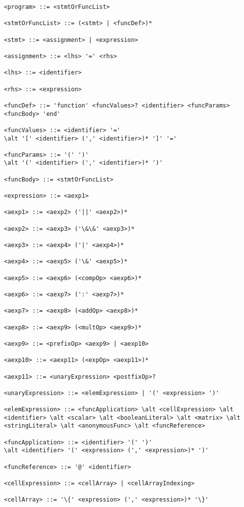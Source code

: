 \begin{lstlisting}
<program> ::= <stmtOrFuncList>

<stmtOrFuncList> ::= (<stmt> | <funcDef>)*

<stmt> ::= <assignment> | <expression>

<assignment> ::= <lhs> '=' <rhs>

<lhs> ::= <identifier>

<rhs> ::= <expression>

<funcDef> ::= 'function' <funcValues>? <identifier> <funcParams> <funcBody> 'end'

<funcValues> ::= <identifier> '='
\alt '[' <identifier> (',' <identifier>)* ']' '='

<funcParams> ::= '(' ')'
\alt '(' <identifier> (',' <identifier>)* ')'

<funcBody> ::= <stmtOrFuncList>

<expression> ::= <aexp1>

<aexp1> ::= <aexp2> ('||' <aexp2>)*

<aexp2> ::= <aexp3> ('\&\&' <aexp3>)*

<aexp3> ::= <aexp4> ('|' <aexp4>)*

<aexp4> ::= <aexp5> ('\&' <aexp5>)*

<aexp5> ::= <aexp6> (<compOp> <aexp6>)*

<aexp6> ::= <aexp7> (':' <aexp7>)*

<aexp7> ::= <aexp8> (<addOp> <aexp8>)*

<aexp8> ::= <aexp9> (<multOp> <aexp9>)*

<aexp9> ::= <prefixOp> <aexp9> | <aexp10>

<aexp10> ::= <aexp11> (<expOp> <aexp11>)*

<aexp11> ::= <unaryExpression> <postfixOp>?

<unaryExpression> ::= <elemExpression> | '(' <expression> ')'

<elemExpression> ::= <funcApplication> \alt <cellExpression> \alt <identifier> \alt <scalar> \alt <booleanLiteral> \alt <matrix> \alt <stringLiteral> \alt <anonymousFunc> \alt <funcReference>

<funcApplication> ::= <identifier> '(' ')'
\alt <identifier> '(' <expression> (',' <expression>)* ')'

<funcReference> ::= '@' <identifier>

<cellExpression> ::= <cellArray> | <cellArrayIndexing>

<cellArray> ::= '\{' <expression> (',' <expression>)* '\}'


\end{lstlisting}
